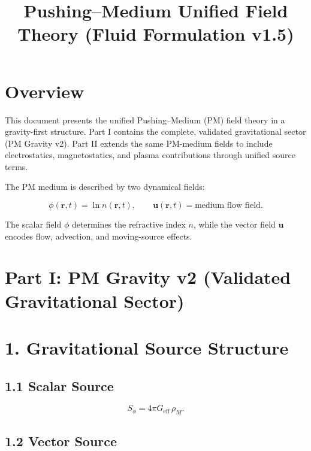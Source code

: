 \documentclass{article}
\begin{document}
\title{Pushing--Medium Unified Field Theory (Fluid Formulation v1.5)}
\author{}
\date{}
\maketitle

\section*{Overview}

This document presents the unified Pushing--Medium (PM) field theory in a
gravity-first structure. Part I contains the complete, validated gravitational
sector (PM Gravity v2). Part II extends the same PM-medium fields to include
electrostatics, magnetostatics, and plasma contributions through unified source
terms.

The PM medium is described by two dynamical fields:


\[
\phi(\mathbf r,t) = \ln n(\mathbf r,t),
\qquad
\mathbf u(\mathbf r,t) = \text{medium flow field}.
\]



The scalar field $\phi$ determines the refractive index $n$, while the vector
field $\mathbf u$ encodes flow, advection, and moving-source effects.

\section*{Part I: PM Gravity v2 (Validated Gravitational Sector)}

\section*{1. Gravitational Source Structure}

\subsection*{1.1 Scalar Source}


\[
S_\phi = 4\pi G_{\mathrm{eff}}\,\rho_M.
\]



\subsection*{1.2 Vector Source}
\end{document}

